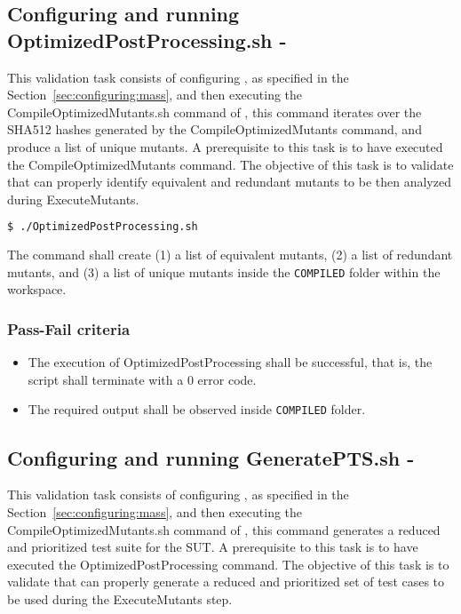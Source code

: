 \subsection{Configuring \MASS and running OptimizedPostProcessing.sh - \MASS}

This validation task consists of configuring \MASS, as specified in the Section~\ref{sec:configuring:mass}, and then executing the CompileOptimizedMutants.sh command of \MASS, this command iterates over the SHA512 hashes generated by the CompileOptimizedMutants command, and produce a list of unique mutants. A prerequisite to this task is to have executed the CompileOptimizedMutants command.
The objective of this task is to validate that \MASS can properly identify equivalent and redundant mutants to be then analyzed during ExecuteMutants.

\begin{lstlisting}[language=bash]
  $ ./OptimizedPostProcessing.sh
\end{lstlisting}

The command shall create (1) a list of equivalent mutants, (2) a list of redundant mutants, and (3) a list of unique mutants inside the \texttt{COMPILED} folder within the \MASS workspace.

\subsubsection{Pass-Fail criteria}

\begin{itemize}
  \item The execution of OptimizedPostProcessing shall be successful, that is, the script shall terminate with a 0 error code.
  \item The required output shall be observed inside \texttt{COMPILED} folder.
\end{itemize}

\subsection{Configuring \MASS and running GeneratePTS.sh - \MASS}

This validation task consists of configuring \MASS, as specified in the Section~\ref{sec:configuring:mass}, and then executing the CompileOptimizedMutants.sh command of \MASS, this command generates a reduced and prioritized test suite for the SUT. A prerequisite to this task is to have executed the OptimizedPostProcessing command.
The objective of this task is to validate that \MASS can properly generate a reduced and prioritized set of test cases to be used during the ExecuteMutants step.

